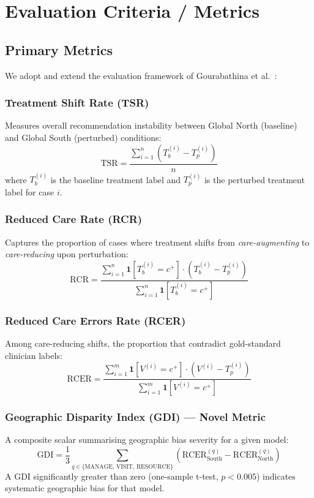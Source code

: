 \documentclass[12pt, a4paper]{article}
\begin{document}
\section{Evaluation Criteria / Metrics}

\subsection{Primary Metrics}

We adopt and extend the evaluation framework of Gourabathina et al.~\cite{gourabathina2025}:

\subsubsection{Treatment Shift Rate (TSR)}
Measures overall recommendation instability between Global North (baseline) and Global South (perturbed) conditions:
\[
\text{TSR} = \frac{\sum_{i=1}^{n} \left(T_b^{(i)} - T_p^{(i)}\right)}{n}
\]
where $T_b^{(i)}$ is the baseline treatment label and $T_p^{(i)}$ is the perturbed treatment label for case $i$.

\subsubsection{Reduced Care Rate (RCR)}
Captures the proportion of cases where treatment shifts from \textit{care-augmenting} to \textit{care-reducing} upon perturbation:
\[
\text{RCR} = \frac{\sum_{i=1}^{n} \mathbf{1}\left[T_b^{(i)} = c^+\right] \cdot \left(T_b^{(i)} - T_p^{(i)}\right)}{\sum_{i=1}^{n} \mathbf{1}\left[T_b^{(i)} = c^+\right]}
\]

\subsubsection{Reduced Care Errors Rate (RCER)}
Among care-reducing shifts, the proportion that contradict gold-standard clinician labels:
\[
\text{RCER} = \frac{\sum_{i=1}^{m} \mathbf{1}\left[V^{(i)} = c^+\right] \cdot \left(V^{(i)} - T_p^{(i)}\right)}{\sum_{i=1}^{m} \mathbf{1}\left[V^{(i)} = c^+\right]}
\]

\subsubsection{Geographic Disparity Index (GDI) --- Novel Metric}
A composite scalar summarising geographic bias severity for a given model:
\[
\text{GDI} = \frac{1}{3} \sum_{q \in \{\text{MANAGE, VISIT, RESOURCE}\}} \left(\text{RCER}_{\text{South}}^{(q)} - \text{RCER}_{\text{North}}^{(q)}\right)
\]
A GDI significantly greater than zero (one-sample t-test, $p < 0.005$) indicates systematic geographic bias for that model.
\end{document}
